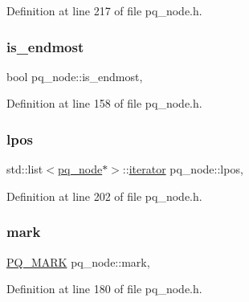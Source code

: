 Definition at line 217 of file pq\+\_\+node.\+h.

\mbox{\label{classpq__node_a058dda3d1197dfd2b343d1983d305d79}} 
\subsubsection{\texorpdfstring{is\+\_\+endmost}{is\_endmost}}
{\footnotesize\ttfamily bool pq\+\_\+node\+::is\+\_\+endmost\hspace{0.3cm}{\ttfamily [protected]}, {\ttfamily [inherited]}}



Definition at line 158 of file pq\+\_\+node.\+h.

\mbox{\label{classpq__node_a71cc9bb3c11aac468ff77d64643c38dc}} 
\subsubsection{\texorpdfstring{lpos}{lpos}}
{\footnotesize\ttfamily std\+::list$<$\mbox{\hyperlink{classpq__node}{pq\+\_\+node}}$\ast$$>$\+::\mbox{\hyperlink{classpq__node_a34898c9eb1527787c07e8ebefd6bfba5}{iterator}} pq\+\_\+node\+::lpos\hspace{0.3cm}{\ttfamily [protected]}, {\ttfamily [inherited]}}



Definition at line 202 of file pq\+\_\+node.\+h.

\mbox{\label{classpq__node_aee913582a7b268ce2570bee8a8367c50}} 
\subsubsection{\texorpdfstring{mark}{mark}}
{\footnotesize\ttfamily \mbox{\hyperlink{classpq__node_a6236b20cd5f6cc02cb5f637ed34c96d9}{P\+Q\+\_\+\+M\+A\+RK}} pq\+\_\+node\+::mark\hspace{0.3cm}{\ttfamily [protected]}, {\ttfamily [inherited]}}



Definition at line 180 of file pq\+\_\+node.\+h.

